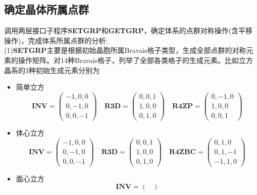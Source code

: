 \documentclass{article}      %
\begin{document}
\subsection{确定晶体所属点群}
调用两层接口子程序\textbf{SETGRP}和\textbf{GETGRP}，确定体系的点群对称操作(含平移操作)，完成体系所属点群的分析:~\\
(1)\textbf{SETGRP}主要是根据初始晶胞所属\textrm{Bravais}格子类型，生成全部点群的对称元素的操作矩阵。对14种\textrm{Bravais}格子，列举了全部各类格子的生成元素。比如立方晶系的3种初始生成元素分别为
\begin{itemize}
	\item 简单立方
\begin{displaymath}
	\mathbf{INV}=
	\begin{pmatrix}
		-1, 0, 0 \\ 
		0,-1, 0 \\
		0, 0, -1
	\end{pmatrix}\quad
	\mathbf{R3D}=
	\begin{pmatrix}
		0, 0, 1 \\ 
		1, 0, 0 \\
		0, 1, 0
	\end{pmatrix}\quad
	\mathbf{R4ZP}=
	\begin{pmatrix}
		0, -1, 0 \\ 
		1, 0, 0 \\
		0, 0, 1
	\end{pmatrix}
\end{displaymath}
	\item 体心立方
\begin{displaymath}
	\mathbf{INV}=
	\begin{pmatrix}
		-1, 0, 0 \\ 
		0,-1, 0 \\
		0, 0, -1
	\end{pmatrix}\quad
	\mathbf{R3D}=
	\begin{pmatrix}
		0, 0, 1 \\ 
		1, 0, 0 \\
		0, 1, 0
	\end{pmatrix}\quad
	\mathbf{R4ZBC}=
	\begin{pmatrix}
		0, 1, 0 \\ 
		0, 1, -1 \\
		-1, 1, 0
	\end{pmatrix}
\end{displaymath}
	\item 面心立方
\begin{displaymath}
	\mathbf{INV}=
	\begin{pmatrix}

\end{pmatrix}
\end{displaymath}
\end{itemize}
\end{document}
